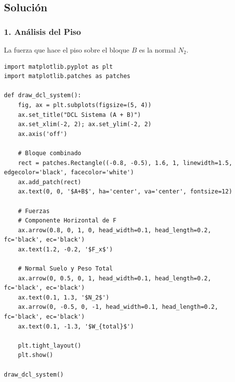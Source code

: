\documentclass[12pt, a4paper]{article}
\begin{document}
\begin{center}
\end{center}

\subsection*{Solución}

\subsubsection*{1. Análisis del Piso }
La fuerza que hace el piso sobre el bloque $B$ es la normal $N_2$.

\begin{lstlisting}
import matplotlib.pyplot as plt
import matplotlib.patches as patches

def draw_dcl_system():
    fig, ax = plt.subplots(figsize=(5, 4))
    ax.set_title("DCL Sistema (A + B)")
    ax.set_xlim(-2, 2); ax.set_ylim(-2, 2)
    ax.axis('off')
    
    # Bloque combinado
    rect = patches.Rectangle((-0.8, -0.5), 1.6, 1, linewidth=1.5, edgecolor='black', facecolor='white')
    ax.add_patch(rect)
    ax.text(0, 0, '$A+B$', ha='center', va='center', fontsize=12)
    
    # Fuerzas
    # Componente Horizontal de F
    ax.arrow(0.8, 0, 1, 0, head_width=0.1, head_length=0.2, fc='black', ec='black')
    ax.text(1.2, -0.2, '$F_x$')
    
    # Normal Suelo y Peso Total
    ax.arrow(0, 0.5, 0, 1, head_width=0.1, head_length=0.2, fc='black', ec='black')
    ax.text(0.1, 1.3, '$N_2$')
    ax.arrow(0, -0.5, 0, -1, head_width=0.1, head_length=0.2, fc='black', ec='black')
    ax.text(0.1, -1.3, '$W_{total}$')

    plt.tight_layout()
    plt.show()

draw_dcl_system()
\end{lstlisting}
\end{document}
